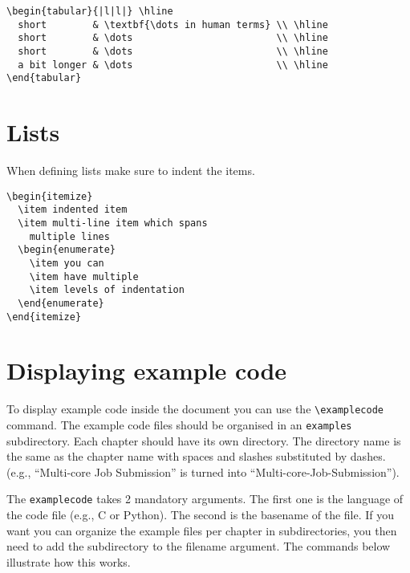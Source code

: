 \documentclass[11pt,a4paper]{article}
\begin{document}
\begin{verbatim}
\begin{tabular}{|l|l|} \hline
  short        & \textbf{\dots in human terms} \\ \hline
  short        & \dots                         \\ \hline
  short        & \dots                         \\ \hline
  a bit longer & \dots                         \\ \hline
\end{tabular}
\end{verbatim}

\section{Lists}
\label{sec:lists}

When defining lists make sure to indent the items.

\begin{verbatim}
\begin{itemize}
  \item indented item
  \item multi-line item which spans
    multiple lines
  \begin{enumerate}
    \item you can
    \item have multiple
    \item levels of indentation
  \end{enumerate}
\end{itemize}
\end{verbatim}

\section{Displaying example code}
\label{sec:displaying-example-code}

To display example code inside the document you can use the \verb|\examplecode|
command. The example code files should be organised in an \verb|examples|
subdirectory.  Each chapter should have its own directory. The directory name
is the same as the chapter name with spaces and slashes substituted by dashes.
(e.g., ``Multi-core Job Submission'' is turned into
``Multi-core-Job-Submission'').

The \verb|examplecode| takes 2 mandatory arguments. The first one is the
language of the code file (e.g., C or Python). The second is the basename of the
file. If you want you can organize the example files per chapter in
subdirectories, you then need to add the subdirectory to the filename argument.
The commands below illustrate how this works.
\end{document}
